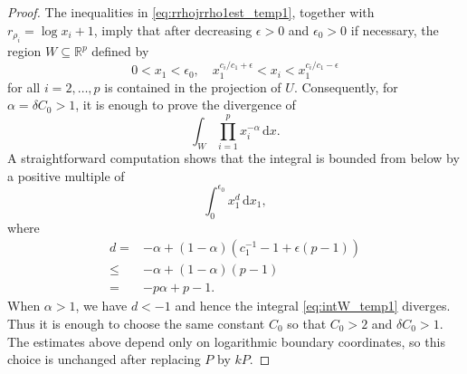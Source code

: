 \begin{proof}
    The inequalities in \eqref{eq:rrhojrrho1est_temp1}, together with $r_{\rho_i}=\log x_i+1$, imply that after decreasing $\epsilon>0$ and $\epsilon_0>0$ if necessary, the region $W\subseteq \mathbb{R}^p$ defined by
    \[
    0<x_1<\epsilon_0,\quad x_1^{c_i/c_1+\epsilon}<x_i<x_1^{c_i/c_1-\epsilon}
    \]
    for all $i=2,\ldots,p$ is contained in the projection of $U$. Consequently, for $\alpha=\delta C_0>1$, it is enough to prove the divergence of
    \begin{equation}\label{eq:intW_temp1}
    \int_W \prod_{i=1}^p x_i^{-\alpha}\,\mathrm{d}x.
    \end{equation}
    A straightforward computation shows that the integral is bounded from below by a positive multiple of
    \[
    \int_0^{\epsilon_0}x_1^{d}\,\mathrm{d}x_1,
    \]
    where
    \[
    \begin{aligned}
    d=& -\alpha+(1-\alpha)\left(c_1^{-1}-1+\epsilon(p-1)\right)\\
    \leq & -\alpha+(1-\alpha)(p-1)\\
    =& -p\alpha+p-1.
    \end{aligned}
    \]
    When $\alpha>1$, we have $d<-1$ and hence the integral \eqref{eq:intW_temp1} diverges. Thus it is enough to choose the same constant $C_0$ so that $C_0>2$ and $\delta C_0>1$. The estimates above depend only on logarithmic boundary coordinates, so this choice is unchanged after replacing $P$ by $kP$.

\end{proof}



